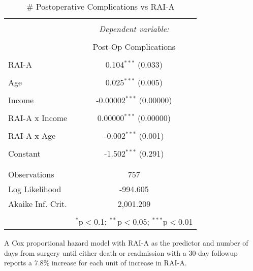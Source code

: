 \begin{wraptable}{r}{5.5cm}
  \caption{  \# Postoperative Complications vs RAI-A}\label{wrap-tab:2}
\begin{tabular}{@{\extracolsep{5pt}}lc} 
\\[-1.8ex]\hline 
\hline \\[-1.8ex] 
 & \multicolumn{1}{c}{\textit{Dependent variable:}} \\ 
\cline{2-2} 
\\[-1.8ex] & Post-Op Complications \\ 
\hline \\[-1.8ex] 
 RAI-A & 0.104$^{***}$ (0.033) \\ 
  & \\ 
 Age & 0.025$^{***}$ (0.005) \\ 
  & \\ 
 Income & -0.00002$^{***}$ (0.00000) \\ 
  & \\ 
 RAI-A x Income & 0.00000$^{***}$ (0.00000) \\ 
  & \\ 
 RAI-A x Age & -0.002$^{***}$ (0.001) \\ 
  & \\ 
 Constant & -1.502$^{***}$ (0.291) \\ 
  & \\ 
\hline \\[-1.8ex] 
Observations & 757 \\ 
Log Likelihood & -994.605 \\ 
Akaike Inf. Crit. & 2,001.209 \\ 
\hline 
\hline \\[-1.8ex] 
  & \multicolumn{1}{r}{$^{*}$p$<$0.1; $^{**}$p$<$0.05; $^{***}$p$<$0.01} \\ 
\end{tabular} 
\end{wraptable} 

A Cox proportional hazard model with RAI-A as the predictor and number of days from surgery until either death or readmission with a 30-day followup reports a 7.8\% increase for each unit of increase in RAI-A.

